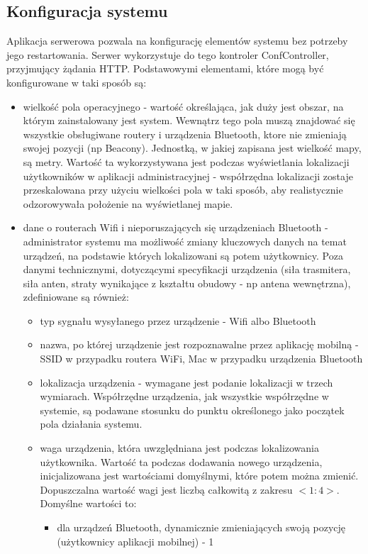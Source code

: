 \subsection{Konfiguracja systemu}
Aplikacja serwerowa pozwala na konfigurację elementów systemu bez potrzeby jego restartowania. Serwer wykorzystuje do tego kontroler ConfController, przyjmujący żądania HTTP. Podstawowymi elementami, które mogą być konfigurowane w taki sposób są:
\begin{itemize}
	\item wielkość pola operacyjnego - wartość określająca, jak duży jest obszar, na którym zainstalowany jest system. Wewnątrz tego pola muszą znajdować się wszystkie obsługiwane routery i urządzenia Bluetooth, ktore nie zmieniają swojej pozycji (np Beacony). Jednostką, w jakiej zapisana jest wielkość mapy, są metry. Wartość ta wykorzystywana jest podczas wyświetlania lokalizacji użytkowników w aplikacji administracyjnej - współrzędna lokalizacji zostaje przeskalowana przy użyciu wielkości pola w taki sposób, aby realistycznie odzorowywała położenie na wyświetlanej mapie.
	\item dane o routerach Wifi i nieporuszających się urządzeniach Bluetooth - administrator systemu ma możliwość zmiany kluczowych danych na temat urządzeń, na podstawie których lokalizowani są potem użytkownicy. Poza danymi technicznymi, dotyczącymi specyfikacji urządzenia (siła trasmitera, siła anten, straty wynikające z kształtu obudowy - np antena wewnętrzna), zdefiniowane są również:
	\begin{itemize}
		\item typ sygnału wysyłanego przez urządzenie - Wifi albo Bluetooth
		\item nazwa, po której urządzenie jest rozpoznawalne przez aplikację mobilną - SSID w przypadku routera WiFi, Mac w przypadku urządzenia Bluetooth
		\item lokalizacja urządzenia - wymagane jest podanie lokalizacji w trzech wymiarach. Współrzędne urządzenia, jak wszystkie współrzędne w systemie, są podawane stosunku do punktu określonego jako początek pola działania systemu.
		\item waga urządzenia, która uwzględniana jest podczas lokalizowania użytkownika. Wartość ta podczas dodawania nowego urządzenia, inicjalizowana jest wartościami domyślnymi, które potem można zmienić. Dopuszczalna wartość wagi jest liczbą całkowitą z zakresu $<1:4>$. Domyślne wartości to:
		\begin{itemize}
			\item dla urządzeń Bluetooth, dynamicznie zmieniających swoją pozycję (użytkownicy aplikacji mobilnej) - 1

\end{itemize}
\end{itemize}
\end{itemize}
